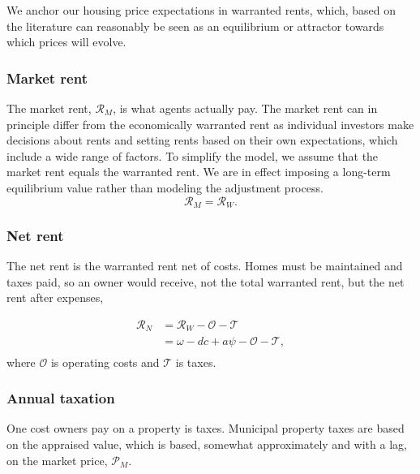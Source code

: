  We anchor our housing price expectations in warranted rents, which, based on the literature can reasonably be seen as an equilibrium or attractor towards which prices will evolve. 

 
\subsubsection{Market rent}\label{Market-Rent}
The \gls{market rent}, $\mathcal{R}_M$, is what agents actually pay. The market rent can in principle differ from the economically warranted rent as individual investors make decisions about rents and setting rents based on their own expectations, which include a wide range of factors. To simplify the model, we assume that the market rent equals the warranted rent. We are in effect imposing a long-term equilibrium value rather than modeling the adjustment process.  %
\[\mathcal{R}_M = \mathcal{R}_W.\] 


\subsubsection{Net rent}\label{Net-Rent}
The \gls{net rent} is the warranted rent net of costs. Homes must be maintained and taxes paid, so an owner would receive, not the total warranted rent, but the net rent after expenses,

\begin{align}
\mathcal{R}_N &= \mathcal{R}_W - \mathcal{O} - \mathcal{T}\\
&= \omega - {dc} + a\psi -  \mathcal{O} - \mathcal{T}, \\
\end{align}
where $\mathcal{O}$ is operating costs and $\mathcal{T}$ is taxes. 






\subsubsection{Annual taxation}

One cost owners pay on a property is taxes. Municipal property taxes are based on the \gls{appraised value}, which is based, somewhat approximately and with a lag, on the \gls{market price}, $\mathcal{P}_M$. %


